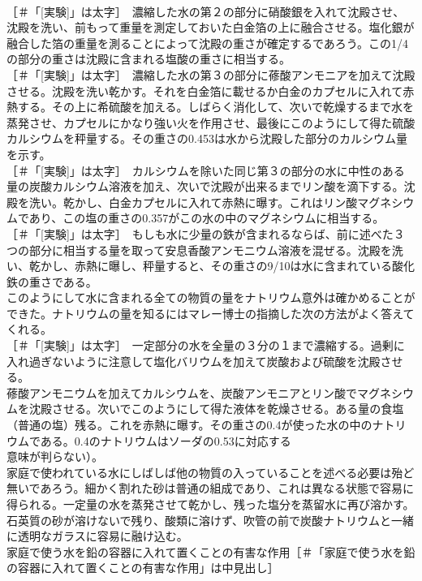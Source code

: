 \documentclass[8pt]{extreport}
\begin{document}
\begin{CJK}{UTF8}{min}
\\	[実験]［＃「[実験]」は太字］　濃縮した水の第２の部分に硝酸銀を入れて沈殿させ、沈殿を洗い、前もって重量を測定しておいた白金箔の上に融合させる。塩化銀が融合した箔の重量を測ることによって沈殿の重さが確定するであろう。この1/4の部分の重さは沈殿に含まれる塩酸の重さに相当する。
\\	[実験]［＃「[実験]」は太字］　濃縮した水の第３の部分に蓚酸アンモニアを加えて沈殿させる。沈殿を洗い乾かす。それを白金箔に載せるか白金のカプセルに入れて赤熱する。その上に希硫酸を加える。しばらく消化して、次いで乾燥するまで水を蒸発させ、カプセルにかなり強い火を作用させ、最後にこのようにして得た硫酸カルシウムを秤量する。その重さの0.453は水から沈殿した部分のカルシウム量を示す。
\\	[実験]［＃「[実験]」は太字］　カルシウムを除いた同じ第３の部分の水に中性のある量の炭酸カルシウム溶液を加え、次いで沈殿が出来るまでリン酸を滴下する。沈殿を洗い。乾かし、白金カプセルに入れて赤熱に曝す。これはリン酸マグネシウムであり、この塩の重さの0.357がこの水の中のマグネシウムに相当する。
\\	[実験]［＃「[実験]」は太字］　もしも水に少量の鉄が含まれるならば、前に述べた３つの部分に相当する量を取って安息香酸アンモニウム溶液を混ぜる。沈殿を洗い、乾かし、赤熱に曝し、秤量すると、その重さの9/10は水に含まれている酸化鉄の重さである。
\\	このようにして水に含まれる全ての物質の量をナトリウム意外は確かめることができた。ナトリウムの量を知るにはマレー博士の指摘した次の方法がよく答えてくれる。
\\	[実験]［＃「[実験]」は太字］　一定部分の水を全量の３分の１まで濃縮する。過剰に入れ過ぎないように注意して塩化バリウムを加えて炭酸および硫酸を沈殿させる。
\\	蓚酸アンモニウムを加えてカルシウムを、炭酸アンモニアとリン酸でマグネシウムを沈殿させる。次いでこのようにして得た液体を乾燥させる。ある量の食塩（普通の塩）残る。これを赤熱に曝す。その重さの0.4が使った水の中のナトリウムである。0.4のナトリウムはソーダの0.53に対応する
\\	意味が判らない）。
\\	家庭で使われている水にしばしば他の物質の入っていることを述べる必要は殆ど無いであろう。細かく割れた砂は普通の組成であり、これは異なる状態で容易に得られる。一定量の水を蒸発させて乾かし、残った塩分を蒸留水に再び溶かす。石英質の砂が溶けないで残り、酸類に溶けず、吹管の前で炭酸ナトリウムと一緒に透明なガラスに容易に融け込む。
\\	家庭で使う水を鉛の容器に入れて置くことの有害な作用［＃「家庭で使う水を鉛の容器に入れて置くことの有害な作用」は中見出し］

\end{CJK}
\end{document}
